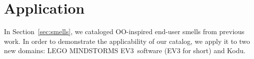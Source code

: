 \documentclass{sig-alternate}
\newcommand{\todo}[1]{\textbf{TODO: #1}}
\newcommand{\ms}{LEGO MINDSTORMS EV3}
\begin{document}





\section{Application}
\label{sec:application}
In Section~\ref{sec:smells}, we cataloged OO-inspired end-user smells from previous work. In order to demonstrate the applicability of our catalog, we apply it to two new domains: \ms~software (EV3 for short) and  Kodu. 
\end{document}
